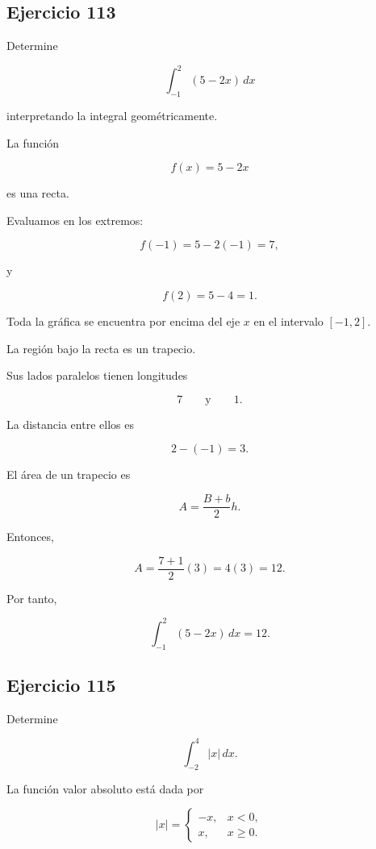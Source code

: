 \documentclass[12pt]{article}
\begin{document}
\subsection*{Ejercicio 113}

Determine

\[
\int_{-1}^{2}(5-2x)\,dx
\]

interpretando la integral geométricamente.

La función

\[
f(x)=5-2x
\]

es una recta.

Evaluamos en los extremos:

\[
f(-1)=5-2(-1)=7,
\]

y

\[
f(2)=5-4=1.
\]

Toda la gráfica se encuentra por encima del eje \(x\) en el intervalo
\([-1,2]\).

La región bajo la recta es un trapecio.

Sus lados paralelos tienen longitudes

\[
7
\qquad\text{y}\qquad
1.
\]

La distancia entre ellos es

\[
2-(-1)=3.
\]

El área de un trapecio es

\[
A
=
\frac{B+b}{2}h.
\]

Entonces,

\[
A
=
\frac{7+1}{2}(3)
=
4(3)
=
12.
\]

Por tanto,

\[
\boxed{
\int_{-1}^{2}(5-2x)\,dx=12
}.
\]

\subsection*{Ejercicio 115}

Determine

\[
\int_{-2}^{4}|x|\,dx.
\]

La función valor absoluto está dada por

\[
|x|
=
\begin{cases}
-x, & x<0,\\
x, & x\geq 0.
\end{cases}
\]
\end{document}
